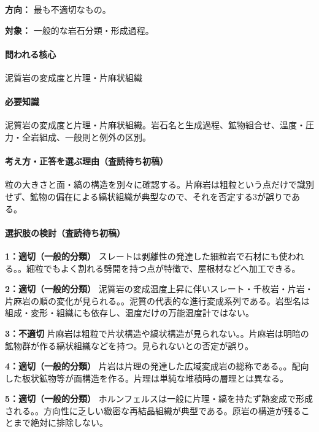 \noindent\textbf{方向：} 最も不適切なもの。\par

\noindent\textbf{対象：} 一般的な岩石分類・形成過程。\par

\paragraph{問われる核心} 泥質岩の変成度と片理・片麻状組織

\paragraph{必要知識} 泥質岩の変成度と片理・片麻状組織。岩石名と生成過程、鉱物組合せ、温度・圧力・全岩組成、一般則と例外の区別。

\paragraph{考え方・正答を選ぶ理由（査読待ち初稿）} 粒の大きさと面・縞の構造を別々に確認する。片麻岩は粗粒という点だけで識別せず、鉱物の偏在による縞状組織が典型なので、それを否定する3が誤りである。

\paragraph{選択肢の検討（査読待ち初稿）}\mbox{}\par

\noindent\textbf{1：適切（一般的分類）} スレートは剥離性の発達した細粒岩で石材にも使われる。。細粒でもよく割れる劈開を持つ点が特徴で、屋根材などへ加工できる。\par

\noindent\textbf{2：適切（一般的分類）} 泥質岩の変成温度上昇に伴いスレート・千枚岩・片岩・片麻岩の順の変化が見られる。。泥質の代表的な進行変成系列である。岩型名は組成・変形・組織にも依存し、温度だけの万能温度計ではない。\par

\noindent\textbf{3：不適切} 片麻岩は粗粒で片状構造や縞状構造が見られない。。片麻岩は明暗の鉱物群が作る縞状組織などを持つ。見られないとの否定が誤り。\par

\noindent\textbf{4：適切（一般的分類）} 片岩は片理の発達した広域変成岩の総称である。。配向した板状鉱物等が面構造を作る。片理は単純な堆積時の層理とは異なる。\par

\noindent\textbf{5：適切（一般的分類）} ホルンフェルスは一般に片理・縞を持たず熱変成で形成される。。方向性に乏しい緻密な再結晶組織が典型である。原岩の構造が残ることまで絶対に排除しない。\par

